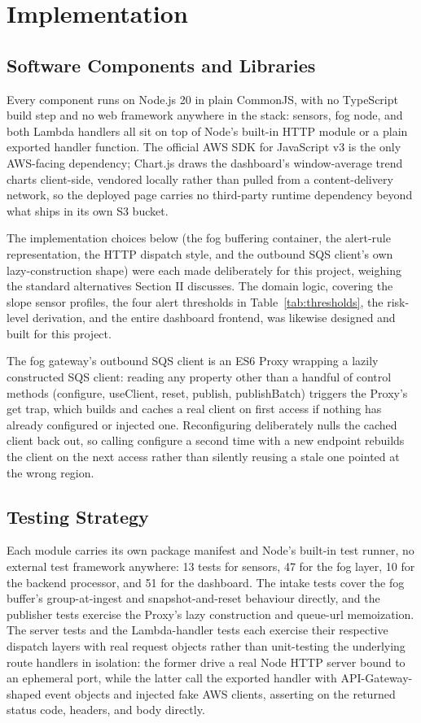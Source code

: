 \documentclass[conference]{IEEEtran}
\begin{document}
\section{Implementation}
\subsection{Software Components and Libraries}
Every component runs on Node.js 20 in plain CommonJS, with no TypeScript build step and no web framework anywhere in the stack: sensors, fog node, and both Lambda handlers all sit on top of Node's built-in HTTP module or a plain exported handler function. The official AWS SDK for JavaScript v3 is the only AWS-facing dependency; Chart.js draws the dashboard's window-average trend charts client-side, vendored locally rather than pulled from a content-delivery network, so the deployed page carries no third-party runtime dependency beyond what ships in its own S3 bucket.

The implementation choices below (the fog buffering container, the alert-rule representation, the HTTP dispatch style, and the outbound SQS client's own lazy-construction shape) were each made deliberately for this project, weighing the standard alternatives Section II discusses. The domain logic, covering the slope sensor profiles, the four alert thresholds in Table~\ref{tab:thresholds}, the risk-level derivation, and the entire dashboard frontend, was likewise designed and built for this project.

The fog gateway's outbound SQS client is an ES6 Proxy wrapping a lazily constructed SQS client: reading any property other than a handful of control methods (configure, useClient, reset, publish, publishBatch) triggers the Proxy's get trap, which builds and caches a real client on first access if nothing has already configured or injected one. Reconfiguring deliberately nulls the cached client back out, so calling configure a second time with a new endpoint rebuilds the client on the next access rather than silently reusing a stale one pointed at the wrong region.

\subsection{Testing Strategy}
Each module carries its own package manifest and Node's built-in test runner, no external test framework anywhere: 13 tests for sensors, 47 for the fog layer, 10 for the backend processor, and 51 for the dashboard. The intake tests cover the fog buffer's group-at-ingest and snapshot-and-reset behaviour directly, and the publisher tests exercise the Proxy's lazy construction and queue-url memoization. The server tests and the Lambda-handler tests each exercise their respective dispatch layers with real request objects rather than unit-testing the underlying route handlers in isolation: the former drive a real Node HTTP server bound to an ephemeral port, while the latter call the exported handler with API-Gateway-shaped event objects and injected fake AWS clients, asserting on the returned status code, headers, and body directly.
\end{document}
